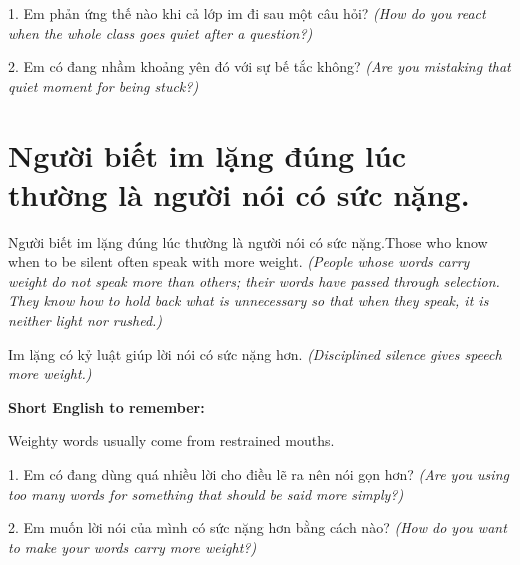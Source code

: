 \begin{tuhocnhanh}
1. Em phản ứng thế nào khi cả lớp im đi sau một câu hỏi? \textit{(How do you react when the whole class goes quiet after a question?)}

2. Em có đang nhầm khoảng yên đó với sự bế tắc không? \textit{(Are you mistaking that quiet moment for being stuck?)}
\end{tuhocnhanh}
\ngancach


\section{Người biết im lặng đúng lúc thường là người nói có sức nặng.}
\begin{truyen}{Người biết im lặng đúng lúc thường là người nói có sức nặng.}{Those who know when to be silent often speak with more weight.}
\textit{(People whose words carry weight do not speak more than others; their words have passed through selection. They know how to hold back what is unnecessary so that when they speak, it is neither light nor rushed.)}
\end{truyen}

\begin{baihoc}
Im lặng có kỷ luật giúp lời nói có sức nặng hơn.
\textit{(Disciplined silence gives speech more weight.)}
\end{baihoc}

\begin{ghinhoanh}
\textbf{Short English to remember:}

Weighty words usually come from restrained mouths.

\end{ghinhoanh}

\begin{tuhocnhanh}
1. Em có đang dùng quá nhiều lời cho điều lẽ ra nên nói gọn hơn? \textit{(Are you using too many words for something that should be said more simply?)}

2. Em muốn lời nói của mình có sức nặng hơn bằng cách nào? \textit{(How do you want to make your words carry more weight?)}
\end{tuhocnhanh}
\ngancach


